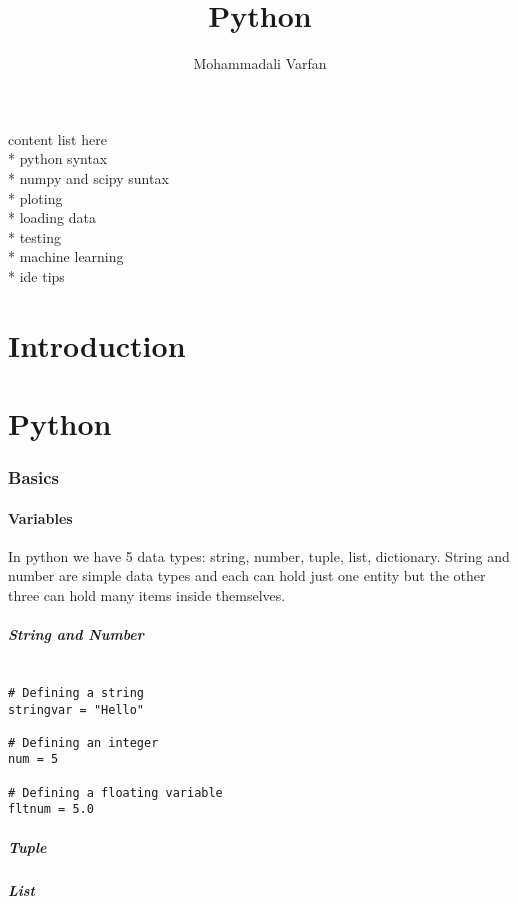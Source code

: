 \documentclass{article}
\title{Python}
\author{Mohammadali Varfan}
\begin{document}
\maketitle
content list here \\*
python syntax \\*
numpy and scipy suntax \\*
ploting \\*
loading data \\*
testing\\*
machine learning \\*
ide tips

\part{Introduction}

\part{Python}
\section{Basics}

\subsection{Variables}
In python we have 5 data types: string, number, tuple, list, dictionary. String and number are simple data types and each can hold just one entity but the other three can hold many items inside themselves.

\subsubsection{String and Number}
\begin{lstlisting}

# Defining a string
stringvar = "Hello"

# Defining an integer
num = 5

# Defining a floating variable
fltnum = 5.0

\end{lstlisting}

\subsubsection{Tuple}
\subsubsection{List}
\end{document}

